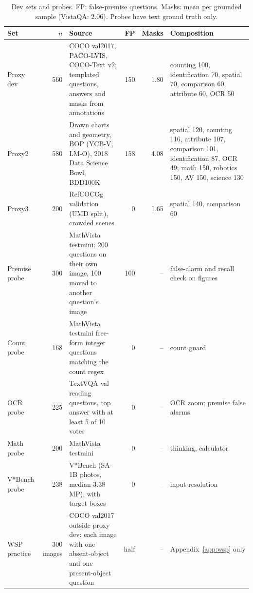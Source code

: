 \documentclass{article}
\begin{document}
\begin{table}[!htbp]
\centering\scriptsize
\caption{Dev sets and probes. FP: false-premise questions. Masks: mean per grounded sample (VistaQA: 2.06). Probes have text ground truth only.}
\label{tab:sets}
\begin{tabular}{@{}>{\raggedright\arraybackslash}p{.72in}r>{\raggedright\arraybackslash}p{1.75in}rr>{\raggedright\arraybackslash}p{1.3in}@{}}
\toprule
Set & $n$ & Source & FP & Masks & Composition \\
\midrule
Proxy dev & 560 & COCO val2017, PACO-LVIS, COCO-Text v2; templated questions, answers and masks from annotations & 150 & 1.80 & counting 100, identification 70, spatial 70, comparison 60, attribute 60, OCR 50 \\
Proxy2 & 580 & Drawn charts and geometry, BOP (YCB-V, LM-O), 2018 Data Science Bowl, BDD100K & 158 & 4.08 & spatial 120, counting 116, attribute 107, comparison 101, identification 87, OCR 49; math 150, robotics 150, AV 150, science 130 \\
Proxy3 & 200 & RefCOCOg validation (UMD split), crowded scenes & 0 & 1.65 & spatial 140, comparison 60 \\
\midrule
Premise probe & 300 & MathVista testmini: 200 questions on their own image, 100 moved to another question's image & 100 & -- & false-alarm and recall check on figures \\
Count probe & 168 & MathVista testmini free-form integer questions matching the count regex & 0 & -- & count guard \\
OCR probe & 225 & TextVQA val reading questions, top answer with at least 5 of 10 votes & 0 & -- & OCR zoom; premise false alarms \\
Math probe & 200 & MathVista testmini & 0 & -- & thinking, calculator \\
V*Bench probe & 238 & V*Bench (SA-1B photos, median 3.38\,MP), with target boxes & 0 & -- & input resolution \\
WSP practice & 300 images & COCO val2017 outside proxy dev; each image with one absent-object and one present-object question & half & -- & Appendix~\ref{app:wsp} only \\
\bottomrule
\end{tabular}
\end{table}
\end{document}
